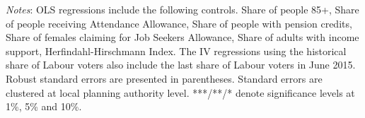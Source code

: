 \documentclass[12pt,letterpaper]{article}
\begin{document}
\begin{table}[h!]
{\begin{tabular}{@{}lccccccccc@{}}
\end{tabular}}
\begin{tablenotes}
      \scriptsize
      \item {\it{Notes}}: OLS regressions include the following controls. Share of people 85+, 
      Share of people receiving Attendance Allowance, Share of people with pension credits, 
      Share of females claiming for Job Seekers Allowance, Share of adults with income 
      support, 
      Herfindahl-Hirschmann Index.
      The IV regressions using the historical share of Labour voters
      also include the last share of Labour voters in June 2015. Robust standard errors are presented in parentheses.
       Standard errors are clustered at local planning 
      authority level. ***/**/* denote significance levels at 1\%, 5\% and 
      10\%. 
    \end{tablenotes}
\end{table}

\newpage
\end{document}
